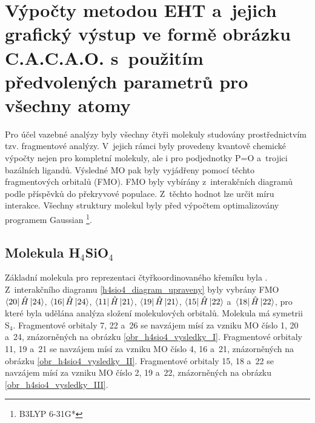 \documentclass[
  printed, %
  table,   %
  lof,     %
  lot,     %
  oneside,
]{fithesis3}
\begin{document}
\section{Výpočty metodou EHT a~jejich grafický výstup ve formě obrázku C.A.C.A.O. s~použitím předvolených parametrů pro všechny atomy} \label{kapitola_EHT}
Pro účel vazebné analýzy byly všechny čtyři molekuly studovány prostřednictvím tzv. fragmentové analýzy. V~jejich rámci byly provedeny kvantově chemické výpočty nejen pro kompletní molekuly, ale i pro podjednotky P=O a~trojici bazálních ligandů. Výsledné MO pak byly vyjádřeny pomocí těchto fragmentových orbitalů (FMO). FMO byly vybírány z~interakčních diagramů podle příspěvků do překryvové populace. Z~těchto hodnot lze určit míru interakce. Všechny struktury molekul byly před výpočtem optimalizovány programem Gaussian \cite{g09} \footnote{B3LYP 6-31G*}.
\subsection{Molekula H$_4$SiO$_4$}
Základní molekula pro reprezentaci čtyřkoordinovaného křemíku byla . Z~interakčního diagramu \ref{h4sio4_diagram_upraveny} byly vybrány FMO $\bra{20}{\hat{H}}\ket{24}$, $\bra{16}{\hat{H}}\ket{24}$, $\bra{11}{\hat{H}}\ket{21}$, $\bra{19}{\hat{H}}\ket{21}$, $\bra{15}{\hat{H}}\ket{22}$ a~$\bra{18}{\hat{H}}\ket{22}$, pro které byla udělána analýza složení molekulových orbitalů. Molekula má symetrii S$_4$. Fragmentové orbitaly 7, 22 a~26 se navzájem mísí za vzniku MO číslo 1, 20 a~24, znázorněných na obrázku \ref{obr_h4sio4_vysledky_I}. Fragmentové orbitaly  11, 19 a~21 se navzájem mísí za vzniku MO číslo 4, 16 a~21, znázorněných na obrázku \ref{obr_h4sio4_vysledky_II}. Fragmentové orbitaly  15, 18 a~22 se navzájem mísí za vzniku MO číslo 2, 19 a~22, znázorněných na obrázku \ref{obr_h4sio4_vysledky_III}.    
\end{document}
